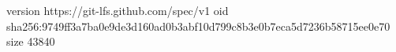 version https://git-lfs.github.com/spec/v1
oid sha256:9749ff3a7ba0e9de3d160ad0b3abf10d799c8b3e0b7eca5d7236b58715ee0e70
size 43840
